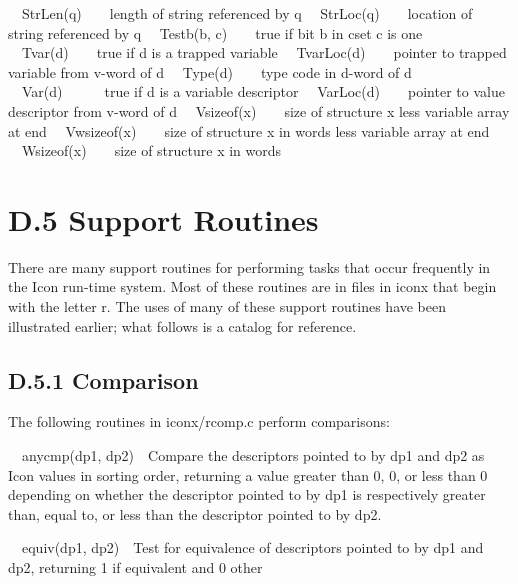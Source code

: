 \ \ StrLen(q)\ \ \ \ length of string referenced by q\newline
\ \ StrLoc(q)\ \ \ \ location of string referenced by q\newline
\ \ Testb(b, c)\ \ \ \ true if bit b in cset c is one\newline
\ \ Tvar(d)\ \ \ \ true if d is a trapped variable\newline
\ \ TvarLoc(d)\ \ \ \ pointer to trapped variable from v-word of d\newline
\ \ Type(d)\ \ \ \ type code in d-word of d\newline
\ \ Var(d)\ \ \ \ \ \ true if d is a variable descriptor\newline
\ \ VarLoc(d)\ \ \ \ pointer to value descriptor from v-word of d\newline
\ \ Vsizeof(x)\ \ \ \ size of structure x less variable array at end\newline
\ \ Vwsizeof(x)\ \ \ \ size of structure x in words less variable array at end\newline
\ \ Wsizeof(x)\ \ \ \ size of structure x in words

\section{D.5 Support Routines}

There are many support routines for performing tasks that occur
frequently in the Icon run-time system. Most of these routines are in
files in iconx that begin with the letter r. The uses of many of these
support routines have been illustrated earlier; what follows is a
catalog for reference.

\subsection{D.5.1 Comparison}

The following routines in iconx/rcomp.c perform comparisons:


\ \ anycmp(dp1, dp2)\ \ Compare the descriptors pointed to by dp1 and
dp2 as Icon values in sorting order, returning a value greater than 0,
0, or less than 0 depending on whether the descriptor pointed to by
dp1 is respectively greater than, equal to, or less than the
descriptor pointed to by dp2.


\ \ equiv(dp1, dp2)\ \ Test for equivalence of descriptors pointed to
by dp1 and dp2, returning 1 if equivalent and 0 other

\clearpage
\bigskip
